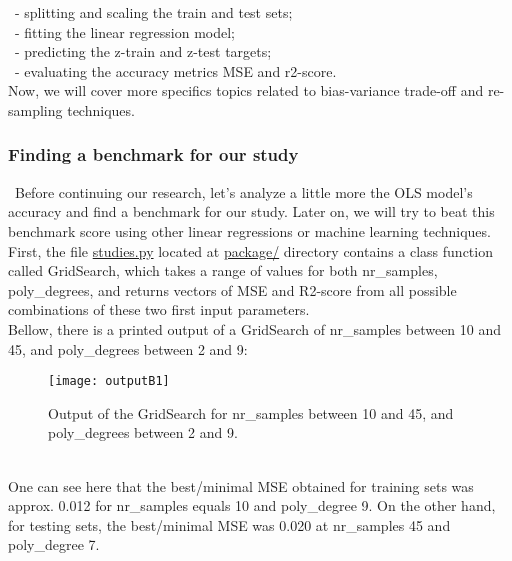 \quad \, - splitting and scaling the train and test sets;\\

\quad \, - fitting the linear regression model;\\

\quad \, - predicting the z-train and z-test targets;\\

\quad \, - evaluating the accuracy metrics MSE and r2-score.\\

Now, we will cover more specifics topics related to bias-variance trade-off and re-sampling techniques.\\

\subsubsection{Finding a benchmark for our study}
\label{chap:Finding a benchmark for our study}

\quad \, Before continuing our research, let's analyze a little more the OLS model's accuracy and find a benchmark for our study. Later on, we will try to beat this benchmark score using other linear regressions or machine learning techniques.\\

First, the file \href{https://github.com/fabiorodp/UiO-FYS-STK4155/blob/master/Project1/package/studies.py}{studies.py} located at \href{https://github.com/fabiorodp/UiO-FYS-STK4155/tree/master/Project1/package}{package/} directory contains a class function called GridSearch, which takes a range of values for both nr\_samples, poly\_degrees, and returns vectors of MSE and R2-score from all possible combinations of these two first input parameters.\\

Bellow, there is a printed output of a GridSearch of nr\_samples between 10 and 45, and poly\_degrees between 2 and 9:\\

\begin{figure}[h]
\label{fig:outputB1}
\texttt{[image: outputB1]}
\caption{Output of the GridSearch for nr\_samples between 10 and 45, and poly\_degrees between 2 and 9.}
\centering
\end{figure}\\

One can see here that the best/minimal MSE obtained for training sets was approx. 0.012 for nr\_samples equals 10 and poly\_degree 9. On the other hand, for testing sets, the best/minimal MSE was 0.020 at nr\_samples 45 and poly\_degree 7.\\


